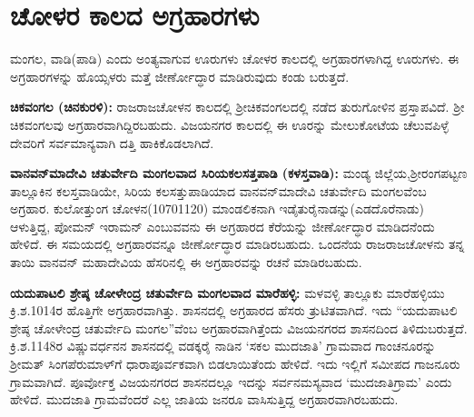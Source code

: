 \section*{ಚೋಳರ ಕಾಲದ ಅಗ್ರಹಾರಗಳು}

ಮಂಗಲ, ವಾಡಿ(ಪಾಡಿ) ಎಂದು ಅಂತ್ಯವಾಗುವ ಊರುಗಳು ಚೋಳರ ಕಾಲದಲ್ಲಿ ಅಗ್ರಹಾರಗಳಾಗಿದ್ದ ಊರುಗಳು. ಈ ಅಗ್ರಹಾರಗಳನ್ನು ಹೊಯ್ಸಳರು ಮತ್ತೆ ಜೀರ್ಣೋದ್ಧಾರ ಮಾಡಿರುವುದು ಕಂಡು ಬರುತ್ತದೆ.

\textbf{ಚಿಕವಂಗಲ (ಚಿನಕುರಳಿ):} ರಾಜರಾಜಚೋಳನ ಕಾಲದಲ್ಲಿ ಶ‍್ರೀಚಿಕವಂಗಲದಲ್ಲಿ ನಡೆದ ತುರುಗೋಳಿನ ಪ್ರಸ್ತಾಪ\-ವಿದೆ. ಶ‍್ರೀ ಚಿಕವಂಗಲವು ಅಗ್ರಹಾರವಾಗಿದ್ದಿರಬಹುದು. ವಿಜಯನಗರ ಕಾಲದಲ್ಲಿ ಈ ಊರನ್ನು ಮೇಲುಕೋಟೆಯ ಚೆಲುವಪಿಳ್ಳೆ ದೇವರಿಗೆ ಸರ್ವಮಾನ್ಯವಾಗಿ ದತ್ತಿ ಹಾಕಿಕೊಡಲಾಗಿದೆ.

\textbf{ವಾನವನ್​ಮಾದೇವಿ ಚತುರ್ವೇದಿ ಮಂಗಲವಾದ ಸಿರಿಯಕಲಸತ್ತಪಾಡಿ (ಕಳಸ್ತವಾಡಿ):} ಮಂಡ್ಯ ಜಿಲ್ಲೆಯ,\break ಶ‍್ರೀರಂಗಪಟ್ಟಣ ತಾಲ್ಲೂಕಿನ ಕಲಸ್ತವಾಡಿಯೇ, ಸಿರಿಯ ಕಲಸತ್ತುಪಾಡಿಯಾದ ವಾನವನ್​ಮಾದೇವಿ ಚತುರ್ವೇದಿ ಮಂಗಲವೆಂಬ ಅಗ್ರಹಾರ. ಕುಲೋತ್ತುಂಗ ಚೋಳನ(1070\enginline{-}1120) ಮಾಂಡಲಿಕನಾಗಿ ಇಡೈತುರೈನಾಡನ್ನು(ಎಡದೊರೆನಾಡು) ಆಳುತ್ತಿದ್ದ, ಪೋಮನ್​ ಇರಾಮನ್​ ಎಂಬುವವನು ಈ ಅಗ್ರಹಾರದ ಕೆರೆಯನ್ನು ಜೀರ್ಣೋದ್ಧಾರ ಮಾಡಿದನೆಂದು ಹೇಳಿದೆ. ಈ ಸಮಯದಲ್ಲಿ ಅಗ್ರಹಾರವನ್ನೂ ಜೀರ್ಣೋದ್ಧಾರ ಮಾಡಿರಬಹುದು. ಒಂದನೆಯ ರಾಜರಾಜಚೋಳನು ತನ್ನ ತಾಯಿ ವಾನವನ್​ ಮಹಾದೇವಿಯ ಹೆಸರಿನಲ್ಲಿ ಈ ಅಗ್ರಹಾರವನ್ನು ರಚನೆ ಮಾಡಿರಬಹುದು.

\textbf{ಯದುಪಾಟಲಿ ಶ್ರೇಷ್ಠ ಚೋಳೇಂದ್ರ ಚತುರ್ವೇದಿ ಮಂಗಲವಾದ ಮಾರೆಹಳ್ಳಿ:} ಮಳವಳ್ಳಿ ತಾಲ್ಲೂಕು ಮಾರೆಹಳ್ಳಿಯು ಕ್ರಿ.ಶ.1014ರ ಹೊತ್ತಿಗೇ ಅಗ್ರಹಾರವಾಗಿತ್ತು. ಶಾಸನದಲ್ಲಿ ಅಗ್ರಹಾರದ ಹೆಸರು ತ್ರುಟಿತವಾಗಿದೆ. ಇದು “ಯದುಪಾಟಲಿ ಶ್ರೇಷ್ಠ ಚೋಳೇಂದ್ರ ಚತುರ್ವೇದಿ ಮಂಗಲ”ವೆಂಬ ಅಗ್ರಹಾರವಾಗಿತ್ತೆಂದು ವಿಜಯನಗರದ ಶಾಸನದಿಂದ ತಿಳಿದುಬರುತ್ತದೆ. ಕ್ರಿ.ಶ.1148ರ ವಿಷ್ಣುವರ್ಧನನ ಶಾಸನದಲ್ಲಿ ವಡಕ್ಕರೈ ನಾಡಿನ ‘ಸಕಲ ಮುದಜಾತಿ’ ಗ್ರಾಮವಾದ ಗಾಂಚನೂರನ್ನು ಶ‍್ರೀಮತ್​ ಸಿಂಗಪೆರುಮಾಳ್​ಗೆ ಧಾರಾಪೂರ್ವಕವಾಗಿ ಬಿಡಲಾಯಿತೆಂದು ಹೇಳಿದೆ. ಇದು ಇಲ್ಲಿಗೆ ಸಮೀಪದ ಗಾಜನೂರು ಗ್ರಾಮವಾಗಿದೆ. ಪೂರ್ವೋಕ್ತ ವಿಜಯನಗರದ ಶಾಸನದಲ್ಲೂ ಇದನ್ನು ಸರ್ವನಮಸ್ಯವಾದ ‘ಮುದಜಾತಿಗ್ರಾಮ’ ಎಂದು ಹೇಳಿದೆ. ಮುದಜಾತಿ ಗ್ರಾಮವೆಂದರೆ ಎಲ್ಲ ಜಾತಿಯ ಜನರೂ ವಾಸಿಸುತ್ತಿದ್ದ ಅಗ್ರಹಾರವಾಗಿರಬಹುದು.

